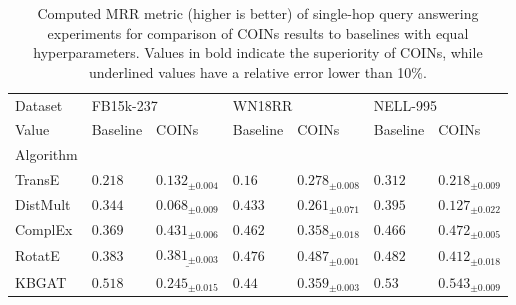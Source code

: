 \begin{table}[ht!]
  \caption[Computed MRR metric of single-hop query answering experiments.]{Computed MRR metric (higher is better) of single-hop query answering experiments for comparison of COINs results to baselines with equal hyperparameters. Values in bold indicate the superiority of COINs, while underlined values have a relative error lower than 10\%.}
  \label{tab:performance_query_answering_mrr}
  \centering
\begin{tabular}{lllllll}
\toprule
Dataset & \multicolumn{2}{l}{FB15k-237} & \multicolumn{2}{l}{WN18RR} & \multicolumn{2}{l}{NELL-995} \\
Value &                 Baseline &                              COINs &                Baseline &                           COINs &                 Baseline &                           COINs \\
Algorithm &                          &                                    &                         &                                 &                          &                                 \\
\midrule
TransE    &              ${{0.218}}$ &            ${{0.132}_{\pm 0.004}}$ &              ${{0.16}}$ &  $\mathbf{{0.278}_{\pm 0.008}}$ &              ${{0.312}}$ &         ${{0.218}_{\pm 0.009}}$ \\
DistMult  &              ${{0.344}}$ &            ${{0.068}_{\pm 0.009}}$ &             ${{0.433}}$ &         ${{0.261}_{\pm 0.071}}$ &              ${{0.395}}$ &         ${{0.127}_{\pm 0.022}}$ \\
ComplEx   &              ${{0.369}}$ &     $\mathbf{{0.431}_{\pm 0.006}}$ &             ${{0.462}}$ &         ${{0.358}_{\pm 0.018}}$ &              ${{0.466}}$ &  $\mathbf{{0.472}_{\pm 0.005}}$ \\
RotatE    &              ${{0.383}}$ &  $\underline{{0.381}_{\pm 0.003}}$ &             ${{0.476}}$ &  $\mathbf{{0.487}_{\pm 0.001}}$ &              ${{0.482}}$ &         ${{0.412}_{\pm 0.018}}$ \\
KBGAT     &              ${{0.518}}$ &            ${{0.245}_{\pm 0.015}}$ &              ${{0.44}}$ &         ${{0.359}_{\pm 0.003}}$ &               ${{0.53}}$ &  $\mathbf{{0.543}_{\pm 0.009}}$ \\
\bottomrule
\end{tabular}
\end{table}

